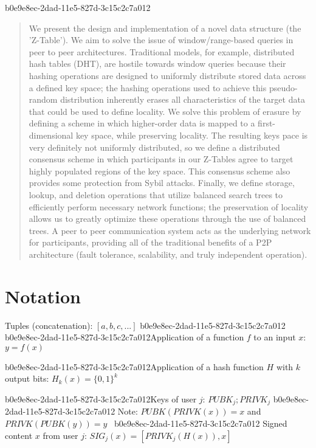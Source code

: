 \documentclass[12pt]{article}
\begin{document}
\maketitle

b0e9e8ec-2dad-11e5-827d-3c15c2c7a012\begin{abstract}
We present the design and implementation of a novel data structure (the 'Z-Table'). We aim to solve the issue of window/range-based queries in peer to peer architectures. Traditional models, for example,  distributed hash tables (DHT), are hostile towards window queries because their hashing operations are designed to uniformly distribute stored data across a defined key space; the hashing operations used to achieve this pseudo-random distribution inherently erases all characteristics of the target data that could be used to define locality. We solve this problem of erasure by defining a scheme in which higher-order data is mapped to a first-dimensional key space, while preserving locality. The resulting keys pace is very definitely not uniformly distributed, so we define a distributed consensus scheme in which participants in our Z-Tables agree to target highly populated regions of the key space. This consensus scheme also provides some protection from Sybil attacks. Finally, we define storage, lookup, and deletion operations that utilize balanced search trees to efficiently perform necessary network functions; the preservation of locality allows us to greatly optimize these operations through the use of balanced trees. A peer to peer communication system acts as the underlying network for participants, providing all of the traditional benefits of a P2P architecture (fault tolerance, scalability, and truly independent operation).
\end{abstract}

\section{Notation}

Tuples (concatenation): $[a,b,c,...]$
b0e9e8ec-2dad-11e5-827d-3c15c2c7a012
b0e9e8ec-2dad-11e5-827d-3c15c2c7a012Application of a function $f$ to an input $x$: $y=f(x)$

b0e9e8ec-2dad-11e5-827d-3c15c2c7a012Application of a hash function $H$ with $k$ output bits: $H_{k}(x) = \{0,1\}^k$

b0e9e8ec-2dad-11e5-827d-3c15c2c7a012Keys of user $j$: $ PUBK_j; PRIVK_j $
b0e9e8ec-2dad-11e5-827d-3c15c2c7a012
Note: $PUBK(PRIVK(x)) = x$ and $PRIVK(PUBK(y)) = y$~
b0e9e8ec-2dad-11e5-827d-3c15c2c7a012
Signed content $x$ from user $j$: $SIG_j(x) = \left[ PRIVK_j( H(x) ), x \right]$
\end{document}
